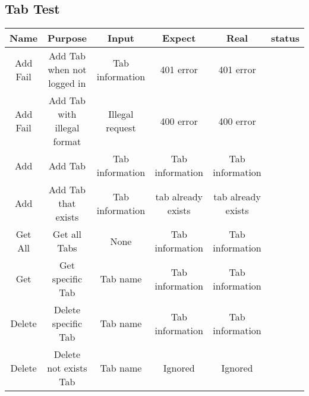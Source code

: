 \begin{landscape}
  \subsection{Tab Test}
  \begin{center}
    \begin{tabular}{c|c|c|c|c|c}
      \hline
      Name     & Purpose                     & Input           & Expect             & Real               & status \\ \hline
      Add Fail & Add Tab when not logged in  & Tab information & 401 error          & 401 error          &        \\ \hline
      Add Fail & Add Tab with illegal format & Illegal request & 400 error          & 400 error          &        \\ \hline
      Add      & Add Tab                     & Tab information & Tab information    & Tab information    &        \\ \hline
      Add      & Add Tab that exists         & Tab information & tab already exists & tab already exists &        \\ \hline
      Get All  & Get all Tabs                & None            & Tab information    & Tab information    &        \\ \hline
      Get      & Get specific Tab            & Tab name        & Tab information    & Tab information    &        \\ \hline
      Delete   & Delete specific Tab         & Tab name        & Tab information    & Tab information    &        \\ \hline
      Delete   & Delete not exists Tab       & Tab name        & Ignored            & Ignored            &        \\ \hline
    \end{tabular}
  \end{center}

\end{landscape}
